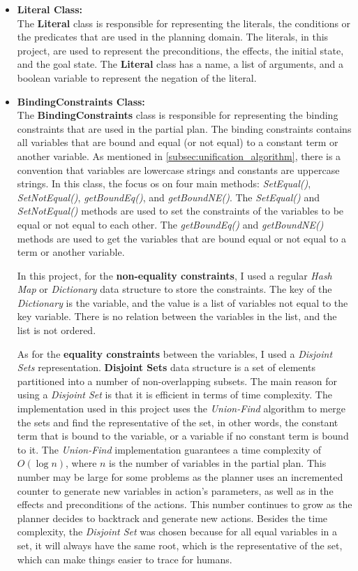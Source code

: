 \begin{itemize}
    \item \textbf{Literal Class:} \\
          The \textbf{Literal} class is responsible for representing the literals, the conditions or the predicates that are used in the planning domain. The literals, in this project, are used to represent the preconditions, the effects, the initial state, and the goal state. The \textbf{Literal} class has a name, a list of arguments, and a boolean variable to represent the negation of the literal.

    \item \textbf{BindingConstraints Class:} \\
          The \textbf{BindingConstraints} class is responsible for representing the binding constraints that are used in the partial plan. The binding constraints contains all variables that are bound and equal (or not equal) to a constant term or another variable. As mentioned in \autoref{subsec:unification_algorithm}, there is a convention that variables are lowercase strings and constants are uppercase strings.
          In this class, the focus os on four main methods: \textit{SetEqual()}, \textit{SetNotEqual()}, \textit{getBoundEq()}, and \textit{getBoundNE()}. The \textit{SetEqual()} and \textit{SetNotEqual()} methods are used to set the constraints of the variables to be equal or not equal to each other. The \textit{getBoundEq()} and \textit{getBoundNE()} methods are used to get the variables that are bound equal or not equal to a term or another variable.

          In this project, for the \textbf{non-equality constraints}, I used a regular \textit{Hash Map} or \textit{Dictionary} data structure to store the constraints. The key of the \textit{Dictionary} is the variable, and the value is a list of variables not equal to the key variable. There is no relation between the variables in the list, and the list is not ordered.

          As for the \textbf{equality constraints} between the variables, I used a \textit{Disjoint Sets} representation. \textbf{Disjoint Sets} data structure is a set of elements partitioned into a number of non-overlapping subsets\cite{WikiDisjointSet}\cite{GeeksForGeeksDisjointSet}. The main reason for using a \textit{Disjoint Set} is that it is efficient in terms of time complexity. The implementation used in this project uses the \textit{Union-Find} algorithm to merge the sets and find the representative of the set, in other words, the constant term that is bound to the variable, or a variable if no constant term is bound to it. The \textit{Union-Find} implementation guarantees a time complexity of $O(\log n)$, where $n$ is the number of variables in the partial plan. This number may be large for some problems as the planner uses an incremented counter to generate new variables in action's parameters, as well as in the effects and preconditions of the actions. This number continues to grow as the planner decides to backtrack and generate new actions. Besides the time complexity, the \textit{Disjoint Set} was chosen because for all equal variables in a set, it will always have the same root, which is the representative of the set, which can make things easier to trace for humans.


\end{itemize}
